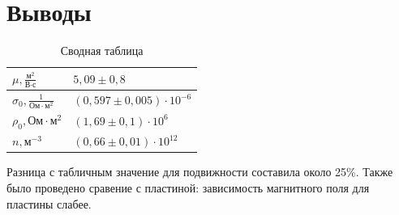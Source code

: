 \documentclass[a4paper, 12pt]{article}
\begin{document}
\section{Выводы}
\begin{table}[H]
	\centering
	\begin{tabular}{|l|l|}
	\hline
	$\mu, \frac{\text{м}^2}{\text{В}\cdot\text{с}}$ & $5,09 \pm 0,8$                    \\ \hline
	$\sigma_0, \frac{1}{\text{Ом}\cdot\text{м}^2}$  & $(0,597 \pm 0,005) \cdot 10^{-6}$ \\ \hline
	$\rho_0, \text{Ом} \cdot \text{м}^2$            & $(1,69 \pm 0,1) \cdot 10^6$       \\ \hline
	$n, \text{м}^{-3}$                              & $(0,66 \pm 0,01) \cdot 10^{12}$   \\ \hline
	\end{tabular}
	\caption{Сводная таблица}
	\label{tab:itog}
	\end{table}
Разница с табличным значение для подвижности составила около 25\%. Также было проведено сравение с пластиной: зависимость магнитного поля для пластины слабее.
\end{document}
